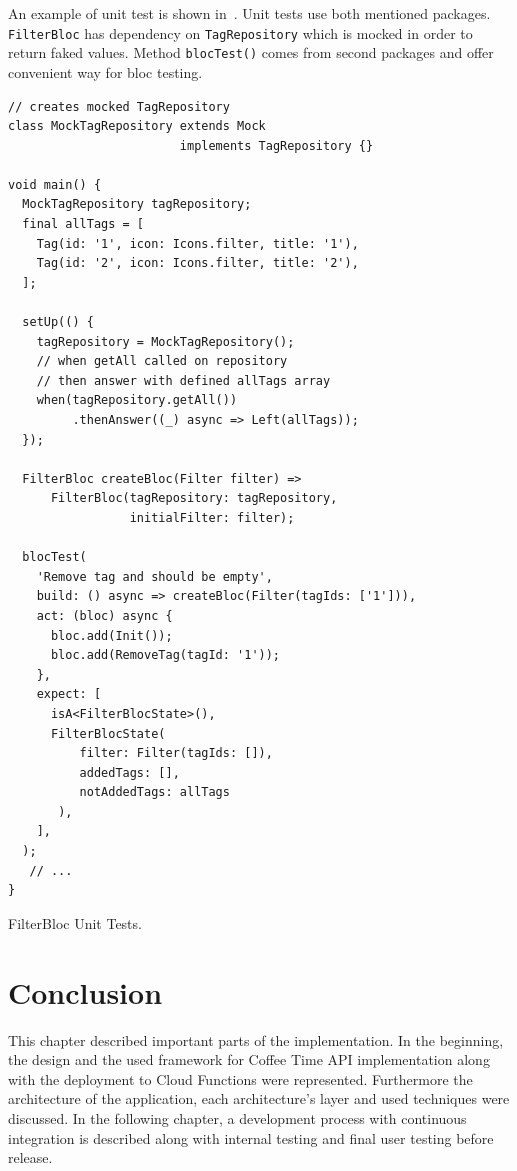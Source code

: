 An example of unit test is shown in~. Unit tests use both mentioned packages. \verb|FilterBloc| has dependency on \verb|TagRepository| which is mocked in order to return faked values. Method \verb|blocTest()| comes from second packages and offer convenient way for \gls{bloc} testing. 

\begin{listing}[ht]
\begin{verbatim}
// creates mocked TagRepository
class MockTagRepository extends Mock 
                        implements TagRepository {}

void main() {
  MockTagRepository tagRepository;
  final allTags = [
    Tag(id: '1', icon: Icons.filter, title: '1'),
    Tag(id: '2', icon: Icons.filter, title: '2'),
  ];

  setUp(() {
    tagRepository = MockTagRepository();
    // when getAll called on repository
    // then answer with defined allTags array
    when(tagRepository.getAll())
         .thenAnswer((_) async => Left(allTags));
  });

  FilterBloc createBloc(Filter filter) =>
      FilterBloc(tagRepository: tagRepository, 
                 initialFilter: filter);
  
  blocTest(
    'Remove tag and should be empty',
    build: () async => createBloc(Filter(tagIds: ['1'])),
    act: (bloc) async {
      bloc.add(Init());
      bloc.add(RemoveTag(tagId: '1'));
    },
    expect: [
      isA<FilterBlocState>(),
      FilterBlocState(
          filter: Filter(tagIds: []), 
          addedTags: [], 
          notAddedTags: allTags
       ),
    ],
  );
   // ...
}
\end{verbatim}
\caption{FilterBloc Unit Tests.}
\label{listing:ct-filter-bloc-unit-tests}
\end{listing}

\section{Conclusion}
This chapter described important parts of the implementation. In the beginning, the design and the used framework for Coffee Time API implementation along with the deployment to Cloud Functions were represented. Furthermore the architecture of the application, each architecture's layer and used techniques were discussed. In the following chapter, a development process with continuous integration is described along with internal testing and final user testing before release.